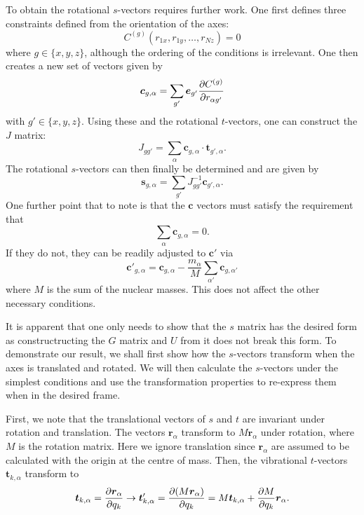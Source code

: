 \documentclass{article}
\newcommand{\vect}[1]{\boldsymbol{#1}}
\begin{document}
To obtain the rotational $s$-vectors requires further work. One first defines three constraints defined from the orientation of the axes: 
\[
C^{(g)}(r_{1x}, r_{1y}, \ldots, r_{Nz}) = 0
\]
where $g \in \{x,y,z\}$, although the ordering of the conditions is irrelevant. One then creates a new set of vectors given by 
\[
\vect{c}_{g, \alpha} = \sum_{g'}\vect{e}_{g'}\pdv{C^{(g)}}{r_{\alpha g'}}
\]
with $g' \in \{x,y,z\}$.  Using these and the rotational $t$-vectors, one can construct the $J$ matrix:  
\[
J_{g g'} = \sum_{\alpha} \vect{c}_{g, \alpha}\cdot  \vect{t}_{g', \alpha}.
\]
The rotational $s$-vectors can then finally be determined and are given by 
\[
\vect{s}_{g, \alpha} = \sum_{g'} J^{-1}_{g g'} \vect{c}_{g', \alpha}. 
\]
One further point that to note is that the $\vect{c}$ vectors must satisfy the requirement that
\[
\sum_{\alpha} \vect{c}_{g, \alpha} = 0.
\]
If they do not, they can be readily adjusted to $\vect{c}'$ via
\[
\vect{c}'_{g, \alpha} = \vect{c}_{g, \alpha} -\frac{m_\alpha}{M} \sum_{\alpha'} \vect{c}_{g, \alpha'} 
\]
where $M$ is the sum of the nuclear masses. This does not affect the other necessary conditions. 

It is apparent that one only needs to show that the $s$ matrix has the desired form as constructructing the $G$ matrix and $U$ from it does not break this form. To demonstrate our result, we shall first show how the $s$-vectors transform when the axes is translated and rotated. We will then calculate the $s$-vectors under the simplest conditions and use the transformation properties to re-express them when in the desired frame. 

First, we note that the translational vectors of $s$ and $t$ are invariant under rotation and translation. The vectors $\vect{r}_\alpha$ transform to $M\vect{r}_\alpha$ under rotation, where $M$ is the rotation matrix. Here we ignore translation since $\vect{r}_\alpha$ are assumed to be calculated with the origin at the centre of mass. Then, the vibrational $t$-vectors $\vect{t}_{k, \alpha}$ transform to 
\[
\vect{t}_{k , \alpha} = \pdv{\vect{r}_\alpha}{q_k} \to \vect{t}'_{k, \alpha} = \pdv{(M\vect{r}_\alpha)}{q_k} = M \vect{t}_{k, \alpha} + \pdv{M}{q_k}\vect{r}_\alpha.
\]
\end{document}
